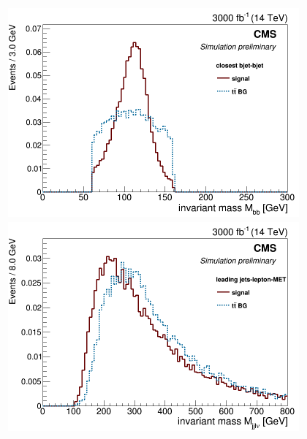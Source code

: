 \documentclass[10pt,a4paper]{article}
\newcommand{\ww}{7.7cm} %
\begin{document}
\begin{figure}[h]
	
  \begin{subfigure}[b]{17cm}
    \begin{minipage}[h!]{\ww}
      \centering
      \includegraphics[width=\ww]{figs/M_bb_closest.png}
    \end{minipage}
    \begin{minipage}[h!]{\ww}
      \centering
      \includegraphics[width=\ww]{figs/M_jjlnu.png}
    \end{minipage}
  \end{subfigure}


\end{figure}
\end{document}
